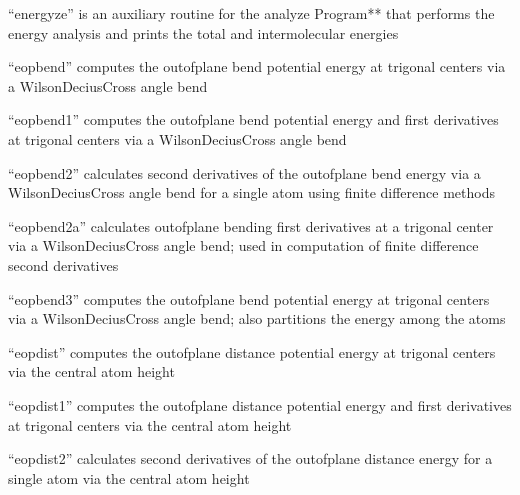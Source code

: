 \documentclass[letterpaper,11pt,english]{sphinxmanual}
\begin{document}

“energyze” is an auxiliary routine for the analyze Program** that performs the energy analysis and prints the total and intermolecular energies


“eopbend” computes the out\sphinxhyphen{}of\sphinxhyphen{}plane bend potential energy at trigonal centers via a Wilson\sphinxhyphen{}Decius\sphinxhyphen{}Cross angle bend


“eopbend1” computes the out\sphinxhyphen{}of\sphinxhyphen{}plane bend potential energy and first derivatives at trigonal centers via a Wilson\sphinxhyphen{}Decius\sphinxhyphen{}Cross angle bend


“eopbend2” calculates second derivatives of the out\sphinxhyphen{}of\sphinxhyphen{}plane bend energy via a Wilson\sphinxhyphen{}Decius\sphinxhyphen{}Cross angle bend for a single atom using finite difference methods


“eopbend2a” calculates out\sphinxhyphen{}of\sphinxhyphen{}plane bending first derivatives at a trigonal center via a Wilson\sphinxhyphen{}Decius\sphinxhyphen{}Cross angle bend; used in computation of finite difference second derivatives


“eopbend3” computes the out\sphinxhyphen{}of\sphinxhyphen{}plane bend potential energy at trigonal centers via a Wilson\sphinxhyphen{}Decius\sphinxhyphen{}Cross angle bend; also partitions the energy among the atoms


“eopdist” computes the out\sphinxhyphen{}of\sphinxhyphen{}plane distance potential energy at trigonal centers via the central atom height


“eopdist1” computes the out\sphinxhyphen{}of\sphinxhyphen{}plane distance potential energy and first derivatives at trigonal centers via the central atom height


“eopdist2” calculates second derivatives of the out\sphinxhyphen{}of\sphinxhyphen{}plane distance energy for a single atom via the central atom height
\end{document}
